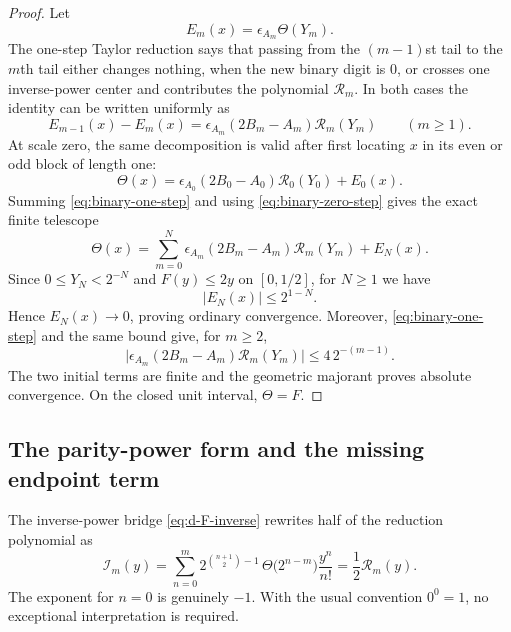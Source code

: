 \documentclass[11pt]{article}
\numberwithin{equation}{section}
\theoremstyle{definition}
\theoremstyle{remark}
\newcommand{\Th}{\Theta}
\begin{document}
\begin{proof}
Let
\begin{equation}\label{eq:binary-remainder}
 E_m(x)=\epsilon_{A_m}\Th(Y_m).
\end{equation}
The one-step Taylor reduction says that passing from the $(m-1)$st tail to
the $m$th tail either changes nothing, when the new binary digit is $0$, or
crosses one inverse-power center and contributes the polynomial
$\mathcal R_m$.  In both cases the identity can be written uniformly as
\begin{equation}\label{eq:binary-one-step}
 E_{m-1}(x)-E_m(x)
 =\epsilon_{A_m}(2B_m-A_m)\mathcal R_m(Y_m)
 \qquad(m\geq1).
\end{equation}
At scale zero, the same decomposition is valid after first locating $x$ in
its even or odd block of length one:
\begin{equation}\label{eq:binary-zero-step}
 \Th(x)=\epsilon_{A_0}(2B_0-A_0)\mathcal R_0(Y_0)+E_0(x).
\end{equation}
Summing \eqref{eq:binary-one-step} and using
\eqref{eq:binary-zero-step} gives the exact finite telescope
\begin{equation}\label{eq:binary-finite-telescope}
 \Th(x)=\sum_{m=0}^{N}
 \epsilon_{A_m}(2B_m-A_m)\mathcal R_m(Y_m)+E_N(x).
\end{equation}
Since $0\leq Y_N<2^{-N}$ and $F(y)\leq2y$ on $[0,1/2]$, for $N\geq1$ we
have
\begin{equation}\label{eq:binary-remainder-bound}
 |E_N(x)|\leq2^{1-N}.
\end{equation}
Hence $E_N(x)\to0$, proving ordinary convergence.  Moreover,
\eqref{eq:binary-one-step} and the same bound give, for $m\geq2$,
\begin{equation}\label{eq:binary-summand-bound}
 \bigl|\epsilon_{A_m}(2B_m-A_m)\mathcal R_m(Y_m)\bigr|
 \leq4\,2^{-(m-1)}.
\end{equation}
The two initial terms are finite and the geometric majorant proves absolute
convergence.  On the closed unit interval, $\Th=F$.
\end{proof}

\subsection{The parity-power form and the missing endpoint term}

The inverse-power bridge \eqref{eq:d-F-inverse} rewrites half of the reduction
polynomial as
\begin{equation}\label{eq:parity-inner}
 \mathcal I_m(y)=
 \sum_{n=0}^{m}
 2^{\binom{n+1}{2}-1}\,
 \Th\bigl(2^{n-m}\bigr)\frac{y^n}{n!}
 =\frac12\mathcal R_m(y).
\end{equation}
The exponent for $n=0$ is genuinely $-1$.  With the usual convention
$0^0=1$, no exceptional interpretation is required.
\end{document}
